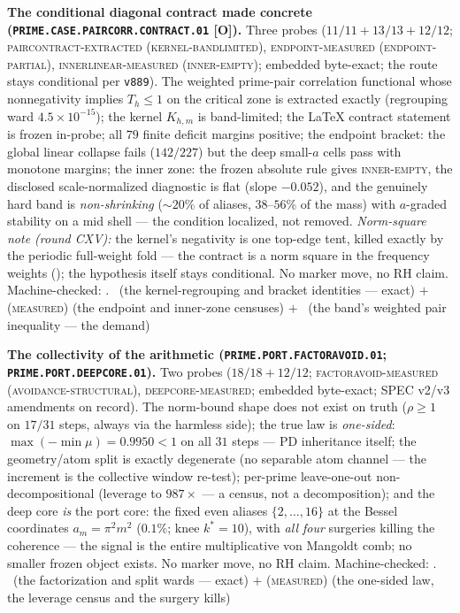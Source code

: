 \documentclass[11pt,a4paper]{article}
\theoremstyle{definition}
\begin{document}
\par\smallskip\noindent\textbf{The conditional diagonal
contract made concrete
(\texttt{PRIME.CASE.PAIRCORR.\allowbreak CONTRACT.01} [O]).}
Three probes ($11/11 + 13/13 + 12/12$;
\textsc{paircontract-extracted (kernel-bandlimited)},
\textsc{endpoint-measured (endpoint-partial)},
\textsc{innerlinear-measured (inner-empty)}; embedded
byte-exact; the route stays conditional per \texttt{v889}).
The weighted prime-pair correlation functional whose
nonnegativity implies $T_h \le 1$ on the critical zone is
extracted exactly (regrouping ward $4.5\times10^{-15}$); the
kernel $K_{h,m}$ is band-limited; the LaTeX contract statement
is frozen in-probe; all $79$ finite deficit margins positive;
the endpoint bracket: the global linear collapse fails
($142/227$) but the deep small-$a$ cells pass with monotone
margins; the inner zone: the frozen absolute rule gives
\textsc{inner-empty}, the disclosed scale-normalized
diagnostic is flat (slope $-0.052$), and the genuinely hard
band is \emph{non-shrinking} (${\sim}20\%$ of aliases,
$38$--$56\%$ of the mass) with $a$-graded stability on a mid
shell --- the condition localized, not removed.  \emph{Norm-square
note (round CXV):} the kernel's negativity is one top-edge tent,
killed exactly by the periodic full-weight fold --- the contract
is a norm square in the frequency weights
(); the hypothesis itself
stays conditional.  No marker
move, no RH claim.
Machine-checked: .
\mE\ (the kernel-regrouping and bracket identities --- exact)
$+$ (\textsc{measured}) (the endpoint and inner-zone censuses)
$+$ \mO\ (the band's weighted pair inequality --- the demand)
\par\smallskip

\par\smallskip\noindent\textbf{The collectivity of the
arithmetic (\texttt{PRIME.PORT.\allowbreak FACTORAVOID.01};
\texttt{PRIME.PORT.\allowbreak DEEPCORE.01}).}
Two probes ($18/18 + 12/12$; \textsc{factoravoid-measured
(avoidance-structural)}, \textsc{deepcore-measured}; embedded
byte-exact; SPEC v2/v3 amendments on record).  The norm-bound
shape does not exist on truth ($\rho \ge 1$ on $17/31$ steps,
always via the harmless side); the true law is
\emph{one-sided}: $\max(-\min\mu) = 0.9950 < 1$ on all $31$
steps --- PD inheritance itself; the geometry/atom split is
exactly degenerate (no separable atom channel --- the
increment is the collective window re-test); per-prime
leave-one-out non-decompositional (leverage to $987\times$ ---
a census, not a decomposition); and the deep core \emph{is}
the port core: the fixed even aliases $\{2, \dots, 16\}$ at
the Bessel coordinates $a_m = \pi^2 m^2$ ($0.1\%$; knee $k^{*}
= 10$), with \emph{all four} surgeries killing the coherence
--- the signal is the entire multiplicative von Mangoldt comb;
no smaller frozen object exists.  No marker move, no RH claim.
Machine-checked: .
\mE\ (the factorization and split wards --- exact) $+$
(\textsc{measured}) (the one-sided law, the leverage census
and the surgery kills)
\par\smallskip
\end{document}
